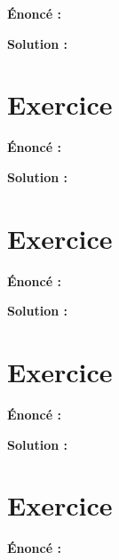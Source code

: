 \documentclass[12pt,french,oneside]{report}
\begin{document}
\begin{spacing}{1.2}
\textbf{\large Énoncé :}


\color{blue}
\medskip\textbf{\large Solution :}


\color{black}


\section{Exercice }

\textbf{\large Énoncé :}



\color{blue}
\medskip\textbf{\large Solution :}


\color{black}


\section{Exercice }

\textbf{\large Énoncé :}



\color{blue}
\medskip\textbf{\large Solution :}


\color{black}


\section{Exercice }

\textbf{\large Énoncé :}



\color{blue}
\medskip\textbf{\large Solution :}


\color{black}


\section{Exercice }

\textbf{\large Énoncé :}




\end{spacing}
\end{document}
